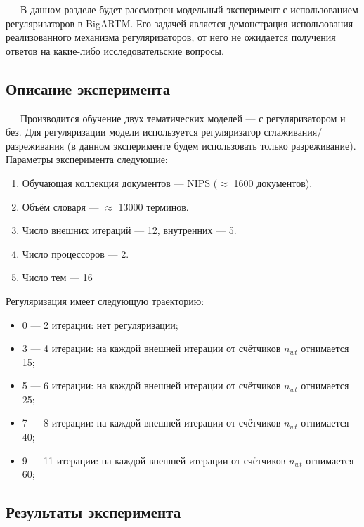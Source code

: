 
$\quad\;\:$В данном разделе будет рассмотрен модельный эксперимент с использованием регуляризаторов в BigARTM. Его задачей является демонстрация использования реализованного механизма регуляризаторов, от него не ожидается получения ответов на какие-либо исследовательские вопросы.

\subsection{Описание эксперимента} 
$\quad\;\:$Производится обучение двух тематических моделей --- с регуляризатором и без. Для регуляризации модели используется регуляризатор сглаживания/разреживания (в данном эксперименте будем использовать только разреживание). Параметры эксперимента следующие:

\begin{enumerate}
	\item Обучающая коллекция документов --- NIPS ($\approx$ 1600 документов).
	\item Объём словаря --- $\approx$ 13000 терминов.
	\item Число внешних итераций --- 12, внутренних --- 5.
	\item Число процессоров --- 2.
	\item Число тем --- 16
\end{enumerate} 

Регуляризация имеет следующую траекторию:
\begin{itemize}
	\item 0 --- 2 итерации: нет регуляризации;
	\item 3 --- 4 итерации: на каждой внешней итерации от счётчиков $n_{wt}$ отнимается 15;
	\item 5 --- 6 итерации: на каждой внешней итерации от счётчиков $n_{wt}$ отнимается 25;
	\item 7 --- 8 итерации:  на каждой внешней итерации от счётчиков $n_{wt}$ отнимается 40;
	\item 9 --- 11 итерации: на каждой внешней итерации от счётчиков $n_{wt}$ отнимается 60;
\end{itemize}

\subsection{Результаты эксперимента}

